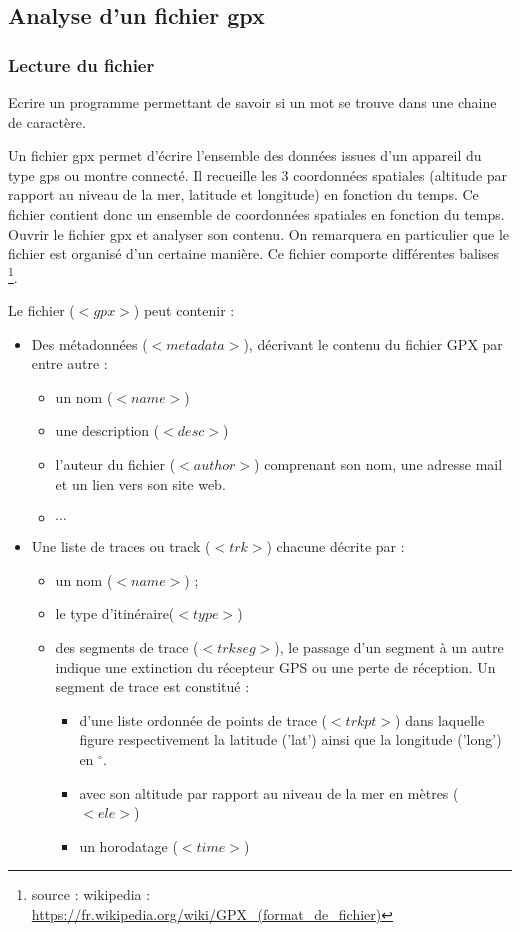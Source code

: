 \subsection{Analyse d'un fichier gpx}

\subsubsection{Lecture du fichier}

\question{} Ecrire un programme permettant de savoir si un mot se trouve dans une chaine de caractère.

Un fichier gpx permet d'écrire l'ensemble des données issues d'un appareil du type gps ou montre connecté. Il recueille les 3 coordonnées spatiales (altitude par rapport au niveau de la mer, latitude et longitude) en fonction du temps. Ce fichier contient donc un ensemble de coordonnées spatiales en fonction du temps.
Ouvrir le fichier gpx et analyser son contenu.
On remarquera en particulier que le fichier est organisé d'un certaine manière. Ce fichier comporte différentes balises \footnote{source : wikipedia : \url{https://fr.wikipedia.org/wiki/GPX_(format_de_fichier)}}.

Le fichier ($<gpx>$) peut contenir :
\begin{itemize}
\item Des métadonnées ($<metadata>$), décrivant le contenu du fichier GPX par entre autre :
\begin{itemize}
\item un nom ($<name>$)
\item une description ($<desc>$)
\item l'auteur du fichier ($<author>$) comprenant son nom, une adresse mail et un lien vers son site web.
\item $\cdots$
\end{itemize}
\item Une liste de traces ou track ($<trk>$) chacune décrite par :
\begin{itemize}
\item un nom ($<name>$) ;
\item  le type d'itinéraire($<type>$)
\item des segments de trace ($<trkseg>$), le passage d'un segment à un autre indique une extinction du récepteur GPS ou une perte de réception. Un segment de trace est constitué :
\begin{itemize}
\item d'une liste ordonnée de points de trace ($<trkpt>$) dans laquelle figure respectivement la latitude ('lat') ainsi que la longitude ('long') en $^{\circ}$.
\item avec son altitude par rapport au niveau de la mer en mètres ($<ele>$)
\item un horodatage ($<time>$)
\end{itemize}
\end{itemize}
\end{itemize}

